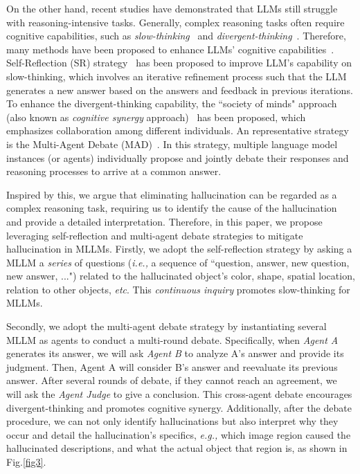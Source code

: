 \documentclass[10pt,twocolumn,letterpaper]{article}
\begin{document}
On the other hand, recent studies have demonstrated that LLMs still struggle with reasoning-intensive tasks. Generally, complex reasoning tasks often require cognitive capabilities, such as \emph{slow-thinking}~\cite{chen2024slow} and \emph{divergent-thinking}~\cite{liang2024divergentthink}. Therefore, 
many methods have been proposed to enhance LLMs' cognitive capabilities~\cite{chan2023chateval}. Self-Reflection (SR) strategy~\cite{shinn2023} has been proposed to improve LLM's capability on slow-thinking, which involves an iterative refinement process such that the LLM generates a new answer based on the answers and feedback in previous iterations. To enhance the divergent-thinking capability, the ``society of minds" approach (also known as \emph{cognitive synergy} approach)~\cite{CognitiveSynergy, chan2023chateval} has been proposed, which emphasizes collaboration among different individuals. An representative strategy is the Multi-Agent Debate (MAD)~\cite{liang2024divergentthink}. In this strategy, multiple language model instances (or agents) individually propose and jointly debate their responses and reasoning processes to arrive at a common answer.

Inspired by this, we argue that eliminating hallucination can be regarded as a complex reasoning task, requiring us to identify the cause of the hallucination and provide a detailed interpretation. Therefore, in this paper, we propose leveraging self-reflection and multi-agent debate strategies to mitigate hallucination in MLLMs.
Firstly, we adopt the self-reflection strategy by asking a MLLM a \emph{series} of questions (\emph{i.e.,} a sequence of ``question, answer, new question, new answer, ...") related to the hallucinated object's color, shape, spatial location, relation to other objects, \emph{etc}. This \emph{continuous inquiry} promotes slow-thinking for MLLMs. 

Secondly, we adopt the multi-agent debate strategy by instantiating several MLLM as agents to conduct a multi-round debate. Specifically, when \emph{Agent A} generates its answer, we will ask \emph{Agent B} to analyze A's answer and provide its judgment. Then, Agent A will consider B's answer and reevaluate its previous answer. After several rounds of debate, if they cannot reach an agreement, we will ask the \emph{Agent Judge} to give a conclusion.
This cross-agent debate encourages divergent-thinking and promotes cognitive synergy. Additionally, after the debate procedure, we can not only identify hallucinations but also interpret why they occur and detail the hallucination's specifics, \emph{e.g.,} which image region caused the hallucinated descriptions, and what the actual object that region is, as shown in Fig.\ref{fig3}.
\end{document}

